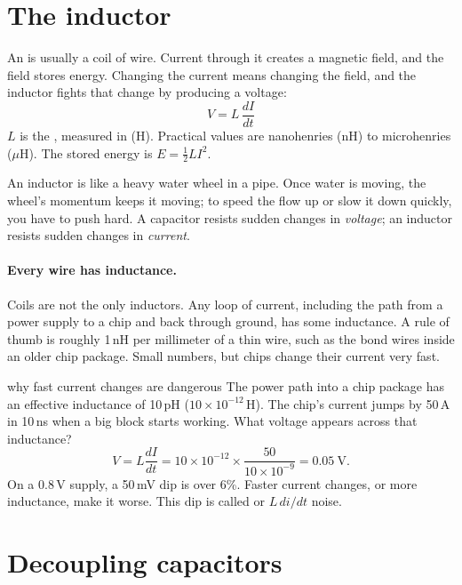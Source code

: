 \section{The inductor}

An  is usually a coil of wire. Current through it creates a magnetic field, and the field stores energy. Changing the current means changing the field, and the inductor fights that change by producing a voltage:
\[
  \boxed{V = L\,\frac{dI}{dt}}
\]
$L$ is the , measured in  (H). Practical values are nanohenries (nH) to microhenries ($\mu$H). The stored energy is $E = \tfrac12 L I^2$.

\begin{everyday}
An inductor is like a heavy water wheel in a pipe. Once water is moving, the wheel's momentum keeps it moving; to speed the flow up or slow it down quickly, you have to push hard. A capacitor resists sudden changes in \emph{voltage}; an inductor resists sudden changes in \emph{current}.
\end{everyday}

\paragraph{Every wire has inductance.} Coils are not the only inductors. Any loop of current, including the path from a power supply to a chip and back through ground, has some inductance. A rule of thumb is roughly 1\,nH per millimeter of a thin wire, such as the bond wires inside an older chip package. Small numbers, but chips change their current very fast.

\begin{worked}{why fast current changes are dangerous}
The power path into a chip package has an effective inductance of 10\,pH ($10 \times 10^{-12}$\,H). The chip's current jumps by 50\,A in 10\,ns when a big block starts working. What voltage appears across that inductance?
\[
  V = L\frac{dI}{dt} = 10\times10^{-12} \times \frac{50}{10\times10^{-9}} = 0.05~\text{V}.
\]
On a 0.8\,V supply, a 50\,mV dip is over 6\%. Faster current changes, or more inductance, make it worse. This dip is called  or $L\,di/dt$ noise.
\end{worked}

\section{Decoupling capacitors}
\label{sec:decap}

